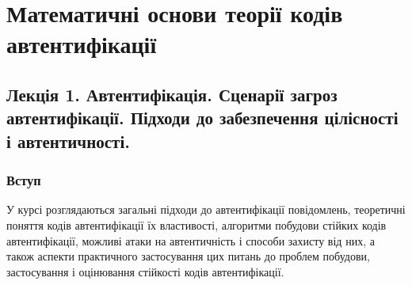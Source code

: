\chapter{Математичні основи теорії кодів автентифікації}
\minitoc

\section{Лекція 1. Автентифікація. Сценарії загроз автентифікації. Підходи до забезпечення цілісності і автентичності.}

\subsection{Вступ}

У курсі розглядаються загальні підходи до автентифікації повідомлень,
теоретичні поняття кодів автентифікації їх властивості, алгоритми побудови
стійких кодів автентифікації, можливі атаки на автентичність і способи
захисту від них, а також аспекти практичного застосування цих питань до
проблем побудови, застосування і оцінювання стійкості кодів
автентифікації.


